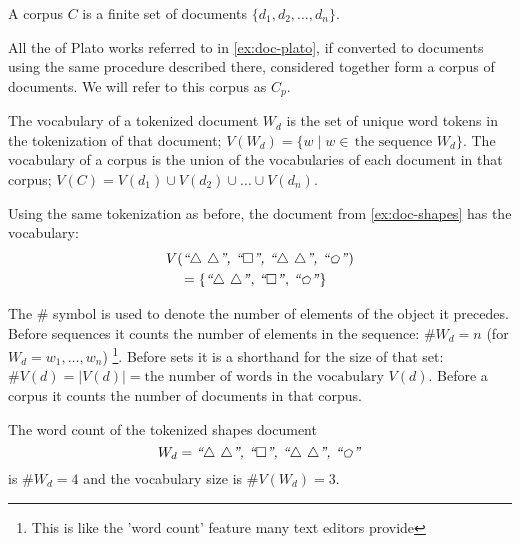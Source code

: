 \begin{definition}[Corpus]
  A corpus $C$ is a finite set of documents $\{d_1, d_2,\dots,d_n\}$.
\end{definition}

\begin{example}\label{ex:corp-plato}
  All the of Plato works referred to in \autoref{ex:doc-plato}, if converted to documents using the same procedure described there, considered together form a corpus of documents. We will refer to this corpus as $C_p$.
\end{example}

\begin{definition}[Vocabulary]
  The vocabulary of a tokenized document $W_d$ is the set of unique word tokens in the tokenization of that document; $V(W_d)=\{w\mid w\in\, \text{the sequence $W_d$}\}$. The vocabulary of a corpus is the union of the vocabularies of each document in that corpus; $V(C)=V(d_1)\cup V(d_2)\cup \dots\cup V(d_n)$.
\end{definition}

\begin{example}
  Using the same tokenization as before, the document from \autoref{ex:doc-shapes} has the vocabulary:
  \begin{align*}
    &V(\text{\emph{``$\triangle$ $\triangle$'', ``$\square$'', ``$\triangle$ $\triangle$'', ``$\pentagon$''}})\\
    &\quad=\{\text{\emph{``$\triangle$ $\triangle$''}},\, \text{\emph{``$\square$''}},\, \text{\emph{``$\pentagon$''}}\}
    \end{align*}
\end{example}
\vspace{6pt}

\begin{definition}[$\#$ Operator]
  The $\#$ symbol is used to denote the number of elements of the object it precedes. Before sequences it counts the number of elements in the sequence: $\#W_d=n$ (for $W_d=w_1,\dots,w_n$) \footnote{This is like the 'word count' feature many text editors provide}. Before sets it is a shorthand for the size of that set: $\#V(d)=|V(d)|=\text{the number of words in the vocabulary $V(d)$}$. Before a corpus it counts the number of documents in that corpus.
\end{definition}

\begin{example}
  The word count of the tokenized shapes document $$W_d=\text{\emph{``$\triangle$ $\triangle$'', ``$\square$'', ``$\triangle$ $\triangle$'', ``$\pentagon$''}}$$ is $\#W_d=4$ and the vocabulary size is $\#V(W_d)=3$.
\end{example}
\vspace{6pt}

